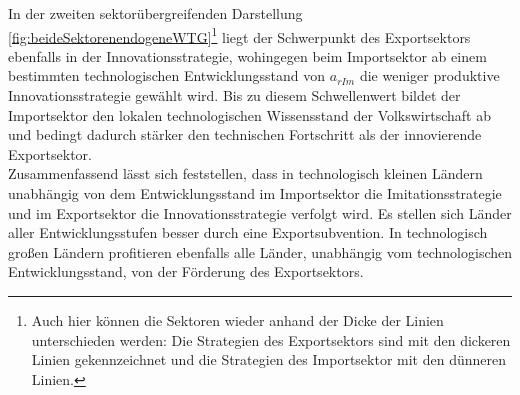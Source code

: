 %
In der zweiten sektorübergreifenden Darstellung \ref{fig:beideSektorenendogeneWTG}\footnote{Auch hier können die Sektoren wieder anhand der Dicke der Linien unterschieden werden: Die Strategien des Exportsektors sind mit den dickeren Linien gekennzeichnet und die Strategien des Importsektor mit den dünneren Linien.} liegt der Schwerpunkt des Exportsektors ebenfalls in der Innovationsstrategie, wohingegen beim Importsektor ab einem bestimmten technologischen Entwicklungsstand von $a_{rIm}$ die weniger produktive Innovationsstrategie gewählt wird. Bis zu diesem Schwellenwert bildet der Importsektor den lokalen technologischen Wissensstand der Volkswirtschaft ab und bedingt dadurch stärker den technischen Fortschritt als der innovierende Exportsektor.\\
%
Zusammenfassend lässt sich feststellen, dass in technologisch kleinen Ländern unabhängig von dem Entwicklungsstand im Importsektor die Imitationsstrategie und im Exportsektor die Innovationsstrategie verfolgt wird. Es stellen sich Länder aller Entwicklungsstufen besser durch eine Exportsubvention. In technologisch großen Ländern profitieren ebenfalls alle Länder, unabhängig vom technologischen Entwicklungsstand, von der Förderung des Exportsektors. 
%
